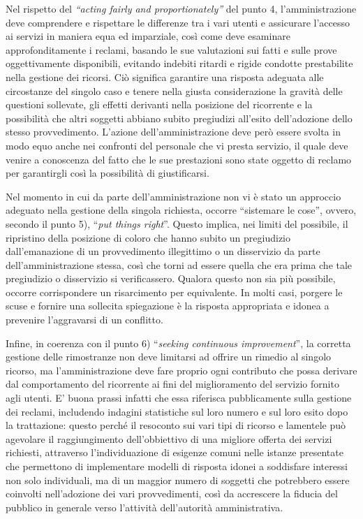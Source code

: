 \documentclass[12pt,it,a4paper,]{report}
\begin{document}
Nel rispetto del \emph{``acting fairly and proportionately''} del punto
4, l'amministrazione deve comprendere e rispettare le differenze tra i
vari utenti e assicurare l'accesso ai servizi in maniera equa ed
imparziale, così come deve esaminare approfonditamente i reclami,
basando le sue valutazioni sui fatti e sulle prove oggettivamente
disponibili, evitando indebiti ritardi e rigide condotte prestabilite
nella gestione dei ricorsi. Ciò significa garantire una risposta
adeguata alle circostanze del singolo caso e tenere nella giusta
considerazione la gravità delle questioni sollevate, gli effetti
derivanti nella posizione del ricorrente e la possibilità che altri
soggetti abbiano subito pregiudizi all'esito dell'adozione dello stesso
provvedimento. L'azione dell'amministrazione deve però essere svolta in
modo equo anche nei confronti del personale che vi presta servizio, il
quale deve venire a conoscenza del fatto che le sue prestazioni sono
state oggetto di reclamo per garantirgli così la possibilità di
giustificarsi.

Nel momento in cui da parte dell'amministrazione non vi è stato un
approccio adeguato nella gestione della singola richiesta, occorre
``sistemare le cose'', ovvero, secondo il punto 5), ``\emph{put things
right}''. Questo implica, nei limiti del possibile, il ripristino della
posizione di coloro che hanno subito un pregiudizio dall'emanazione di
un provvedimento illegittimo o un disservizio da parte
dell'amministrazione stessa, così che torni ad essere quella che era
prima che tale pregiudizio o disservizio si verificassero. Qualora
questo non sia più possibile, occorre corrispondere un risarcimento per
equivalente. In molti casi, porgere le scuse e fornire una sollecita
spiegazione è la risposta appropriata e idonea a prevenire l'aggravarsi
di un conflitto.

Infine, in coerenza con il punto 6) ``\emph{seeking continuous
improvement}'', la corretta gestione delle rimostranze non deve
limitarsi ad offrire un rimedio al singolo ricorso, ma l'amministrazione
deve fare proprio ogni contributo che possa derivare dal comportamento
del ricorrente ai fini del miglioramento del servizio fornito agli
utenti. E' buona prassi infatti che essa riferisca pubblicamente sulla
gestione dei reclami, includendo indagini statistiche sul loro numero e
sul loro esito dopo la trattazione: questo perché il resoconto sui vari
tipi di ricorso e lamentele può agevolare il raggiungimento
dell'obbiettivo di una migliore offerta dei servizi richiesti,
attraverso l'individuazione di esigenze comuni nelle istanze presentate
che permettono di implementare modelli di risposta idonei a soddisfare
interessi non solo individuali, ma di un maggior numero di soggetti che
potrebbero essere coinvolti nell'adozione dei vari provvedimenti, così
da accrescere la fiducia del pubblico in generale verso l'attività
dell'autorità amministrativa.
\end{document}
